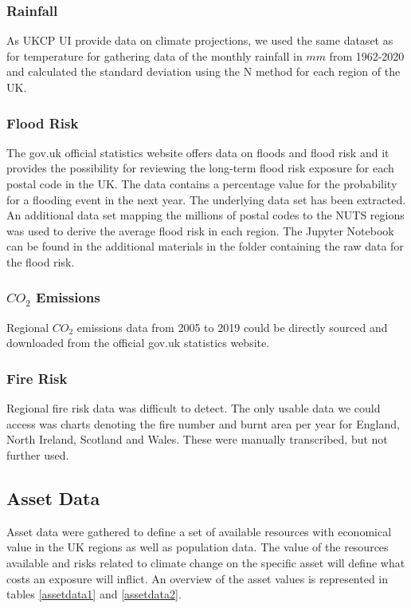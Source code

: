 \documentclass[10pt,a4paper]{article}
\begin{document}
\subsubsection{Rainfall}
As UKCP UI provide data on climate projections, we used the same dataset as for temperature for gathering data of the monthly rainfall in $mm$ from 1962-2020 and calculated the standard deviation using the N method for each region of the UK. \cite{noauthor_uk_nodate}
\subsubsection{Flood Risk}
The gov.uk official statistics website offers data on floods and flood risk and it provides the possibility for reviewing the long-term flood risk exposure for each postal code in the UK. The data contains a percentage value for the probability for a flooding event in the next year. The underlying data set has been extracted. An additional data set mapping the millions of postal codes to the NUTS regions was used to derive the average flood risk in each region. The Jupyter Notebook can be found in the additional materials in the folder containing the raw data for the flood risk. \cite{noauthor_open_nodate,noauthor_postcode_nodate}
\subsubsection{$CO_2$ Emissions}
Regional $CO_2$ emissions data from 2005 to 2019 could be directly sourced and downloaded from the official gov.uk statistics website. \cite{uk,ukc}
\subsubsection{Fire Risk}
Regional fire risk data was difficult to detect. The only usable data we could access was charts denoting the fire number and burnt area per year for England, North Ireland, Scotland and Wales. These were manually transcribed, but not further used. \cite{countryprofile}

\subsection{Asset Data}
Asset data were gathered to define a set of available resources with economical value in the UK regions as well as population data. The value of the resources available and risks related to climate change on the specific asset will define what costs an exposure will inflict. An overview of the asset values is represented in tables \ref{assetdata1} and \ref{assetdata2}.
\end{document}
